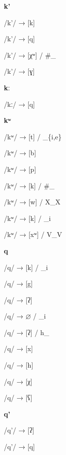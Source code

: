 \begin{center}\textbf{k'}\end{center}
\begin{multicols}{4}
\noindent /k'/ → [k]

\noindent /k'/ → [q]

\noindent /k'/ → [χʷ] / \#\_

\noindent /k'/ → [ɣ]
\end{multicols}

\begin{center}\textbf{kː}\end{center}
\begin{multicols}{4}
\noindent /kː/ → [q]

\end{multicols}

\begin{center}\textbf{kʷ}\end{center}
\begin{multicols}{4}
\noindent /kʷ/ → [t] / \_\{i,e\}

\noindent /kʷ/ → [b]

\noindent /kʷ/ → [p]

\noindent /kʷ/ → [k] / \#\_

\noindent /kʷ/ → [w] / X\_X

\noindent /kʷ/ → [k] / \_i

\noindent /kʷ/ → [xʷ] / V\_V

\end{multicols}

\begin{center}\textbf{q}\end{center}
\begin{multicols}{4}
\noindent /q/ → [k] / \_i

\noindent /q/ → [g]

\noindent /q/ → [ʔ]

\noindent /q/ → $\varnothing$ / \_i

\noindent /q/ → [ʔ] / h\_

\noindent /q/ → [x]

\noindent /q/ → [h]

\noindent /q/ → [χ]

\noindent /q/ → [ʕ]
\end{multicols}

\begin{center}\textbf{q'}\end{center}
\begin{multicols}{4}
\noindent /q'/ → [ʔ]

\noindent /q'/ → [q]
\end{multicols}

